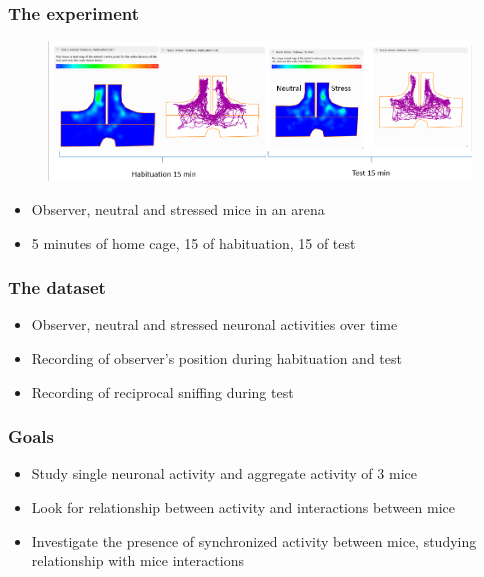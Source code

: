 \documentclass{beamer}
\begin{document}
\begin{frame}
\frametitle{The experiment}


	
\begin{figure}[H]
	\begin{center}
		\includegraphics[scale=.40]{overview_experiment.png} 
	\end{center} 
\end{figure}


\begin{itemize}
	\item Observer, neutral and stressed mice in an arena
	
	\item 5 minutes of home cage, 15 of habituation, 15 of test
\end{itemize}

\end{frame}	
	
\begin{frame}
\frametitle{The dataset}


\begin{itemize}
	\item Observer, neutral and stressed neuronal activities over time
	
	\item Recording of observer's position during habituation and test
	
	\item Recording of reciprocal sniffing during test
	
	
\end{itemize}
\end{frame}	
	
	
	
	\begin{frame}
	\frametitle{Goals}
	
	
	\begin{itemize}
		\item Study single neuronal activity and aggregate activity of 3 mice
		
		\item Look for relationship between activity and interactions between mice
		
		\item Investigate the presence of synchronized activity between mice, studying relationship with mice interactions
		
		
		
		
	\end{itemize}
\end{frame}	
\end{document}
